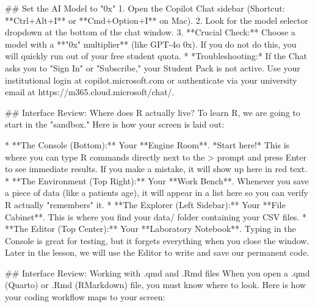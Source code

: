 \documentclass[
  letterpaper,
  DIV=11,
  numbers=noendperiod,
  oneside]{scrreprt}
\newenvironment{Shaded}{\begin{snugshade}}{\end{snugshade}}
\newcommand{\FunctionTok}[1]{\textcolor[rgb]{0.28,0.35,0.67}{#1}}
\newcommand{\InformationTok}[1]{\textcolor[rgb]{0.37,0.37,0.37}{#1}}
\newcommand{\NormalTok}[1]{\textcolor[rgb]{0.00,0.23,0.31}{#1}}
\newcommand{\SpecialStringTok}[1]{\textcolor[rgb]{0.13,0.47,0.30}{#1}}
\begin{document}
\begin{Shaded}
\begin{Highlighting}[numbers=left,,]
\FunctionTok{\#\# Set the AI Model to "0x"}
\SpecialStringTok{1. }\NormalTok{Open the Copilot Chat sidebar (Shortcut: **Ctrl+Alt+I** or **Cmd+Option+I** on Mac).}
\SpecialStringTok{2. }\NormalTok{Look for the model selector dropdown at the bottom of the chat window. }
\SpecialStringTok{3. }\NormalTok{**Crucial Check:** Choose a model with a **"0x" multiplier** (like GPT{-}4o 0x). If you do not do this, you will quickly run out of your free student quota.}
\SpecialStringTok{   * }\NormalTok{*Troubleshooting:* If the Chat asks you to "Sign In" or "Subscribe," your Student Pack is not active. Use your institutional login at }\InformationTok{\textasciigrave{}copilot.microsoft.com\textasciigrave{}}\NormalTok{ or authenticate via your university email at }\InformationTok{\textasciigrave{}https://m365.cloud.microsoft/chat/\textasciigrave{}}\NormalTok{.}
   
\FunctionTok{\#\# Interface Review: Where does R actually live?}
\NormalTok{To learn R, we are going to start in the "sandbox." Here is how your screen is laid out:}

\SpecialStringTok{* }\NormalTok{**The Console (Bottom):** Your **Engine Room**. *Start here!* This is where you can type R commands directly next to the }\InformationTok{\textasciigrave{}\textgreater{}\textasciigrave{}}\NormalTok{ prompt and press Enter to see immediate results. If you make a mistake, it will show up here in red text. }
\SpecialStringTok{* }\NormalTok{**The Environment (Top Right):** Your **Work Bench**. Whenever you save a piece of data (like a patient\textquotesingle{}s age), it will appear in a list here so you can verify R actually "remembers" it.}
\SpecialStringTok{* }\NormalTok{**The Explorer (Left Sidebar):** Your **File Cabinet**. This is where you find your }\InformationTok{\textasciigrave{}data/\textasciigrave{}}\NormalTok{ folder containing your CSV files.}
\SpecialStringTok{* }\NormalTok{**The Editor (Top Center):** Your **Laboratory Notebook**. Typing in the Console is great for testing, but it forgets everything when you close the window. Later in the lesson, we will use the Editor to write and save our permanent code.   }

\FunctionTok{\#\# Interface Review: Working with .qmd and .Rmd files}
\NormalTok{When you open a }\InformationTok{\textasciigrave{}.qmd\textasciigrave{}}\NormalTok{ (Quarto) or }\InformationTok{\textasciigrave{}.Rmd\textasciigrave{}}\NormalTok{ (RMarkdown) file, you must know where to look. Here is how your coding workflow maps to your screen:}


\end{Highlighting}
\end{Shaded}
\end{document}
